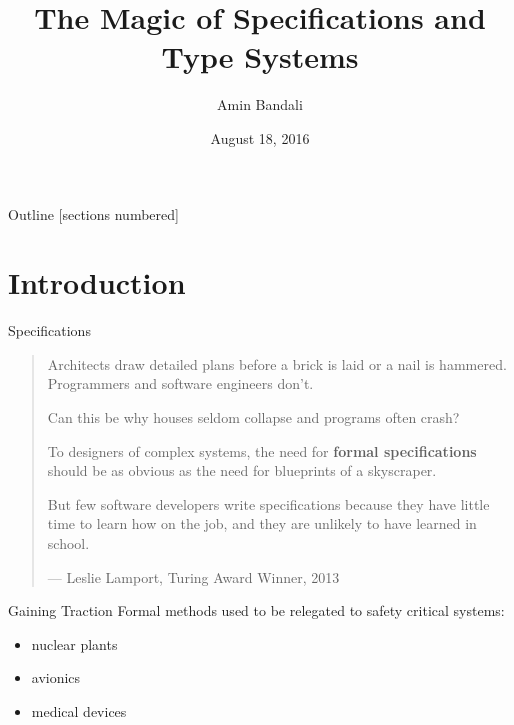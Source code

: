\documentclass[10pt]{beamer}
\title{The Magic of Specifications and Type Systems}
\date{\footnotesize August 18, 2016}
\author{\normalsize Amin Bandali}
\institute{
  Software Engineering Lab, EECS\\
  York University
}
\begin{document}
\maketitle

\begin{frame}{Outline}
  [sections numbered]
  \tableofcontents[hideallsubsections]
\end{frame}


\section{Introduction}

\begin{frame}[fragile]{Specifications}
  \begin{quote}
    \vspace{.4cm}
    {\normalfont \small Architects draw detailed plans before a brick
      is laid or a nail is hammered. Programmers and software
      engineers don't.}\vspace{.3cm}
    \pause

    Can this be why houses seldom collapse and programs often
    crash?\newline
    \pause

    To designers of complex systems, the need for \textbf{formal
      specifications} should be as obvious as the need for blueprints
    of a skyscraper.\newline
    \pause

    But few software developers write specifications because they
    have little time to learn how on the job, and they are unlikely to
    have learned in school.\newline
    \pause

    \hfill \textrm{--- Leslie Lamport, Turing Award Winner, 2013}
  \end{quote}

\end{frame}

\begin{frame}[fragile]{Gaining Traction}
  Formal methods used to be relegated to safety critical systems:
  \begin{itemize}
    \item nuclear plants
    \item avionics
    \item medical devices
  \end{itemize}
\end{frame}
\end{document}
